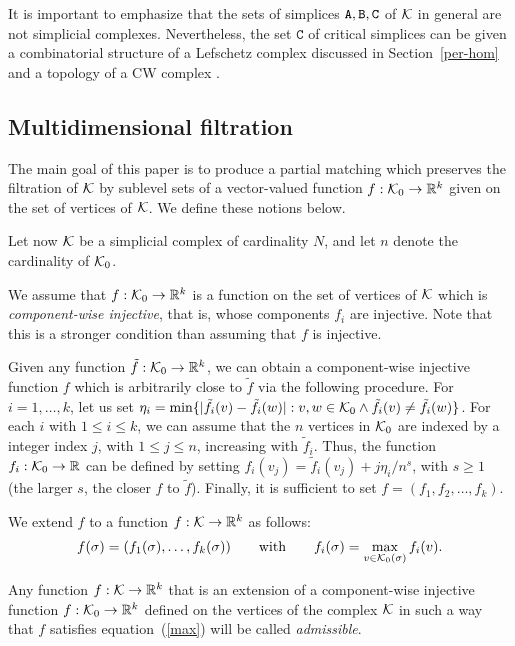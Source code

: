 \documentclass[12pt]{article}
\newcommand{\R}{{\mathbb R}}
\newcommand{\cK}{{\cal K}}
\newcommand{\sB}{\texttt{B}}
\newcommand{\sC}{\texttt{C}} \newcommand{\sD}{\texttt{D}} \newcommand{\sM}{\texttt{M}} \newcommand{\sL}{\texttt{L}}
\begin{document}
\medskip

It is important to emphasize that the sets of simplices $\sA, \sB, \sC$  of $\cK$ in general are not simplicial complexes. Nevertheless, the set $\sC$ of critical simplices can be given a combinatorial structure of a Lefschetz complex discussed in Section~\ref{per-hom} and a  topology of a CW complex \cite{Mun84}.

\subsection{Multidimensional filtration}\label{sec:md-f}

The main goal of this paper is to produce a partial matching which preserves the filtration of $\cK$ by sublevel sets of a vector-valued function $f: \cK_0 \to \R^k$ given on the set of vertices of $\cK$. We define these notions below.

\medskip

Let now $\cK$ be a  simplicial complex of cardinality $N$, and let $n$ denote the cardinality of $\cK_0$.

We assume that $f: \cK_0 \rightarrow \mathbb{R}^k$ is a function  on the set of vertices of $\cK$ which is {\em component-wise injective},
that is, whose components $f_i$ are injective. Note that  this is a stronger condition than assuming that $f$ is injective.


Given any function $\tilde f: \cK_0 \rightarrow \mathbb{R}^k$, we can obtain a component-wise injective function $f$ which is arbitrarily
close to $\tilde f$ via the following procedure.
For $i=1,\ldots ,k$, let us set $\eta_i=\min\{|\tilde f_i(v)-\tilde f_i(w)|: v,w\in \cK_0 \wedge \tilde f_i(v)\ne \tilde f_i(w)\}$.
For each $i$ with $1\le i\le k$, we can assume that the $n$ vertices in $\cK_0$ are indexed by a integer index $j$, with $1\le j\le n$, increasing with $\tilde f_i$. Thus, the
function $f_i:\cK_0 \rightarrow \mathbb{R}$  can be  defined by setting $f_i(v_j)=\tilde f_i(v_j)+j\eta_i/ n^s$, with $s\ge 1$
(the larger $s$, the closer $f$ to $\tilde f$). Finally, it is sufficient to set $f=(f_1,f_2,\ldots, f_k)$.

We extend $f$ to a function $f: \cK \to \R^k$ as follows:
\begin{eqnarray}\label{max}
f(\sigma) = (f_1 (\sigma), \ldots, f_k (\sigma)) \qquad \mbox{with} \qquad f_i (\sigma) = \max_{v \in \cK_0 (\sigma)} f_i (v).
\end{eqnarray}


Any function $f : {\cK} \to \R^k$  that is an extension of a component-wise injective function $f : {\cK}_0 \to \R^k$ defined on
the vertices of the complex $\cK$ in such a way that $f$ satisfies equation~(\ref{max}) will be called \emph{admissible}.
\end{document}
